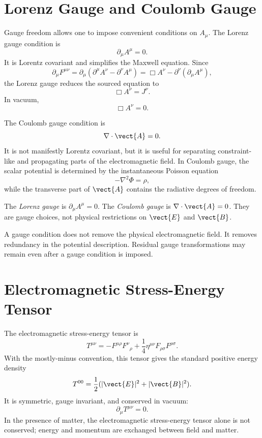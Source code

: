 \section{Lorenz Gauge and Coulomb Gauge}

Gauge freedom allows one to impose convenient conditions on \(A_\mu\). The
Lorenz gauge condition is
\[
    \partial_\mu A^\mu=0.
\]
It is Lorentz covariant and simplifies the Maxwell equation. Since
\[
    \partial_\mu F^{\mu\nu}
    =\partial_\mu(\partial^\mu A^\nu-\partial^\nu A^\mu)
    =\Box A^\nu-\partial^\nu(\partial_\mu A^\mu),
\]
the Lorenz gauge reduces the sourced equation to
\[
    \Box A^\nu=J^\nu.
\]
In vacuum,
\[
    \Box A^\nu=0.
\]

The Coulomb gauge condition is
\[
    \nabla\cdot\vect{A}=0.
\]
It is not manifestly Lorentz covariant, but it is useful for separating
constraint-like and propagating parts of the electromagnetic field. In Coulomb
gauge, the scalar potential is determined by the instantaneous Poisson equation
\[
    -\nabla^2\Phi=\rho,
\]
while the transverse part of \(\vect{A}\) contains the radiative degrees of
freedom.

\begin{definitionbox}
The \emph{Lorenz gauge} is \(\partial_\mu A^\mu=0\). The \emph{Coulomb gauge} is
\(\nabla\cdot\vect{A}=0\). They are gauge choices, not physical restrictions on
\(\vect{E}\) and \(\vect{B}\).
\end{definitionbox}

A gauge condition does not remove the physical electromagnetic field. It removes
redundancy in the potential description. Residual gauge transformations may
remain even after a gauge condition is imposed.

\section{Electromagnetic Stress-Energy Tensor}

The electromagnetic stress-energy tensor is
\[
    T^{\mu\nu}
    =-F^{\mu\rho}F^\nu{}_{\rho}
     +\frac{1}{4}\eta^{\mu\nu}F_{\rho\sigma}F^{\rho\sigma}.
\]
With the mostly-minus convention, this tensor gives the standard positive energy
density
\[
    T^{00}=\frac{1}{2}(|\vect{E}|^2+|\vect{B}|^2).
\]
It is symmetric, gauge invariant, and conserved in vacuum:
\[
    \partial_\mu T^{\mu\nu}=0.
\]
In the presence of matter, the electromagnetic stress-energy tensor alone is
not conserved; energy and momentum are exchanged between field and matter.

